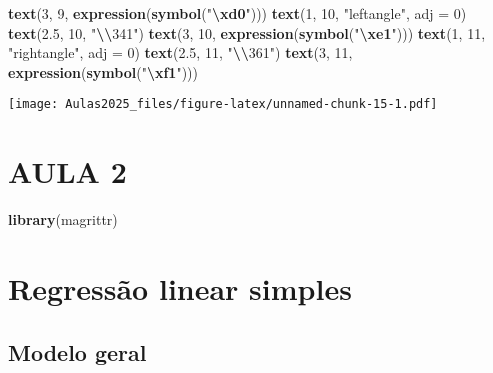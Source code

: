 \documentclass[
]{book}
\newenvironment{Shaded}{\begin{snugshade}}{\end{snugshade}}
\newcommand{\AttributeTok}[1]{\textcolor[rgb]{0.13,0.29,0.53}{#1}}
\newcommand{\DecValTok}[1]{\textcolor[rgb]{0.00,0.00,0.81}{#1}}
\newcommand{\FloatTok}[1]{\textcolor[rgb]{0.00,0.00,0.81}{#1}}
\newcommand{\FunctionTok}[1]{\textcolor[rgb]{0.13,0.29,0.53}{\textbf{#1}}}
\newcommand{\NormalTok}[1]{#1}
\newcommand{\SpecialCharTok}[1]{\textcolor[rgb]{0.81,0.36,0.00}{\textbf{#1}}}
\newcommand{\StringTok}[1]{\textcolor[rgb]{0.31,0.60,0.02}{#1}}
\begin{document}
\begin{Shaded}
\begin{Highlighting}[]
\FunctionTok{text}\NormalTok{(}\DecValTok{3}\NormalTok{, }\DecValTok{9}\NormalTok{, }\FunctionTok{expression}\NormalTok{(}\FunctionTok{symbol}\NormalTok{(}\StringTok{"}\SpecialCharTok{\textbackslash{}xd0}\StringTok{"}\NormalTok{)))}
\FunctionTok{text}\NormalTok{(}\DecValTok{1}\NormalTok{, }\DecValTok{10}\NormalTok{, }\StringTok{"leftangle"}\NormalTok{, }\AttributeTok{adj =} \DecValTok{0}\NormalTok{)}
\FunctionTok{text}\NormalTok{(}\FloatTok{2.5}\NormalTok{, }\DecValTok{10}\NormalTok{, }\StringTok{"}\SpecialCharTok{\textbackslash{}\textbackslash{}}\StringTok{341"}\NormalTok{)}
\FunctionTok{text}\NormalTok{(}\DecValTok{3}\NormalTok{, }\DecValTok{10}\NormalTok{, }\FunctionTok{expression}\NormalTok{(}\FunctionTok{symbol}\NormalTok{(}\StringTok{"}\SpecialCharTok{\textbackslash{}xe1}\StringTok{"}\NormalTok{)))}
\FunctionTok{text}\NormalTok{(}\DecValTok{1}\NormalTok{, }\DecValTok{11}\NormalTok{, }\StringTok{"rightangle"}\NormalTok{, }\AttributeTok{adj =} \DecValTok{0}\NormalTok{)}
\FunctionTok{text}\NormalTok{(}\FloatTok{2.5}\NormalTok{, }\DecValTok{11}\NormalTok{, }\StringTok{"}\SpecialCharTok{\textbackslash{}\textbackslash{}}\StringTok{361"}\NormalTok{)}
\FunctionTok{text}\NormalTok{(}\DecValTok{3}\NormalTok{, }\DecValTok{11}\NormalTok{, }\FunctionTok{expression}\NormalTok{(}\FunctionTok{symbol}\NormalTok{(}\StringTok{"}\SpecialCharTok{\textbackslash{}xf1}\StringTok{"}\NormalTok{)))}
\end{Highlighting}
\end{Shaded}

\texttt{[image: Aulas2025\_files/figure-latex/unnamed-chunk-15-1.pdf]}

\hypertarget{aula-2}{%
\chapter*{AULA 2}\label{aula-2}}

\begin{Shaded}
\begin{Highlighting}[]
\FunctionTok{library}\NormalTok{(magrittr)}
\end{Highlighting}
\end{Shaded}

\hypertarget{regressuxe3o-linear-simples}{%
\chapter{Regressão linear simples}\label{regressuxe3o-linear-simples}}

\hypertarget{modelo-geral}{%
\section{Modelo geral}\label{modelo-geral}}
\end{document}
